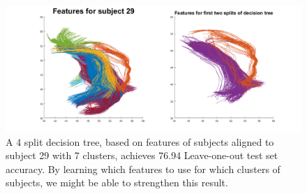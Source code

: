 \documentclass[]{article}
\begin{document}
\begin{figure}[h!]
	\includegraphics[width = \linewidth]{./subject29}
	\caption{A 4 split decision tree, based on features of subjects aligned to subject 29 with 7 clusters, achieves 76.94 Leave-one-out test set accuracy. By learning which features to use for which clusters of subjects, we might be able to strengthen this result.} 
	\label{aligned function}
\end{figure}
\end{document}
